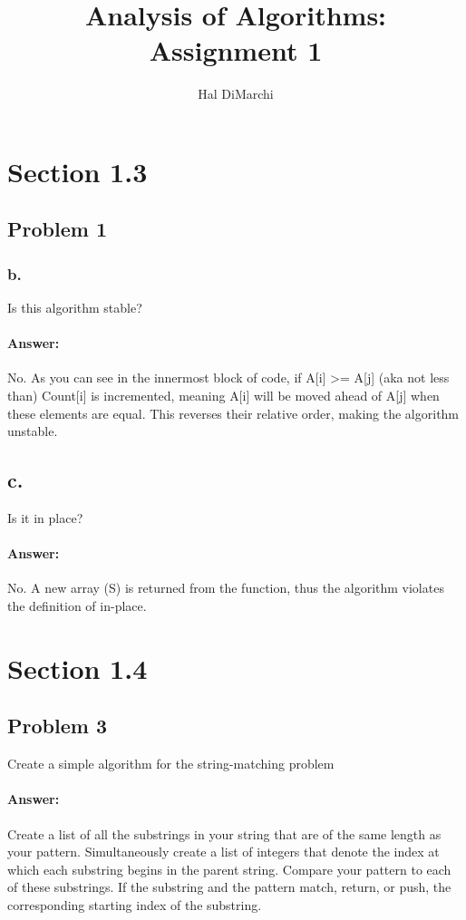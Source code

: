 \documentclass{article}
\title{Analysis of Algorithms: Assignment 1}
\author{Hal DiMarchi}
\begin{document}
\maketitle
\newpage
{}
\section{Section 1.3}
  \subsection{Problem 1}
    \subsubsection{b.}
      Is this algorithm stable?
      \paragraph{Answer:}
        No. As you can see in the innermost block of code, if A[i] >= A[j] (aka not less than)
        Count[i] is incremented, meaning A[i] will be moved ahead of A[j] when these elements are equal.
        This reverses their relative order, making the algorithm unstable.
    \subsection{c.}
      Is it in place?
      \paragraph{Answer:}
        No. A new array (S) is returned from the function, thus the algorithm violates the definition of in-place.
\section{Section 1.4}
  \subsection{Problem 3}
        Create a simple algorithm for the string-matching problem
      \paragraph{Answer:}
        Create a list of all the substrings in your string that are of the same length as your pattern.
        Simultaneously create a list of integers that denote the index at which each substring begins in the parent
        string.
        Compare your pattern to each of these substrings. If the substring and the pattern match, return, or push, the corresponding
        starting index of the substring.
\end{document}

